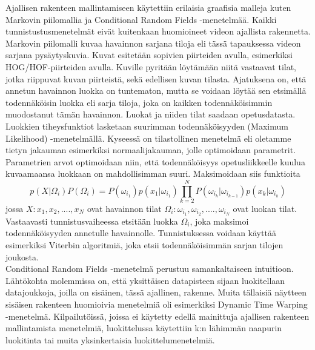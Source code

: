 Ajallisen rakenteen mallintamiseen käytettiin erilaisia graafisia malleja kuten Markovin piilomallia ja Conditional Random Fields -menetelmää.
Kaikki tunnistustusmenetelmät eivät kuitenkaan huomioineet videon ajallista rakennetta. \citep {6239178}\\ 

Markovin piilomalli kuvaa havainnon sarjana tiloja eli tässä tapauksessa videon sarjana pysäytyskuvia. 
Kuvat esitetään sopivien piirteiden avulla, esimerkiksi HOG/HOF-piirteiden avulla. Kuville
pyritään löytämään niitä vastaavat tilat, jotka riippuvat kuvan piirteistä, sekä edellisen kuvan tilasta.
Ajatuksena on, että annetun havainnon luokka on tuntematon, mutta se voidaan löytää sen etsimällä todennäköisin luokka
eli sarja tiloja, joka on kaikken todennäköisimmin muodostanut tämän havainnon. 
Luokat ja niiden tilat saadaan opetusdatasta. \citep{patternreg}\\

Luokkien tiheysfunktiot lasketaan suurimman todennäköisyyden (Maximum Likelihood) -menetelmällä. 
Kyseessä on tilastollinen menetelmä eli oletamme tietyn jakauman esimerkiksi normaalijakauman, jolle optimoidaan parametrit.
Parametrien arvot optimoidaan niin, että todennäköisyys opetusliikkeelle kuulua kuvaamaansa luokkaan on mahdollisimman suuri.
Maksimoidaan siis funktioita
\begin{equation}
p(X|\Omega_i)P(\Omega_i) = P(\omega_{i_1})p(x_1|\omega_{i_1})\prod_{k=2}^{N} P(\omega_{i_k}|\omega_{i_{k-1}}) p(x_k|\omega_{i_k})
\end{equation}
jossa $X:x_1, x_2,....,x_N$ ovat havainnon tilat $\Omega_i:\omega_{i_1}, \omega_{i_2},....,\omega_{i_N}$ ovat luokan tilat.
Vastaavasti tunnistusvaiheessa etsitään luokka $\Omega_i$, joka maksimoi todennäköisyyden annetulle havainnolle. 
Tunnistuksessa voidaan käyttää esimerkiksi Viterbin algoritmiä, joka etsii todennäköisimmän sarjan tilojen joukosta. \citep{patternreg}\\

Conditional Random Fields -menetelmä perustuu samankaltaiseen intuitioon. Lähtökohta molemmissa on, että yksittäisen 
datapisteen sijaan luokitellaan datajoukkoja, joilla on sisäinen, tässä ajallinen, rakenne. \citep {1315232}
Muita tällaisiä näytteen sisäisen rakenteen huomioivia menetelmiä oli esimerkiksi Dynamic Time Warping -menetelmä.
Kilpailutöissä, joissa ei käytetty edellä mainittuja ajallisen rakenteen mallintamista menetelmiä, 
luokittelussa käytettiin k:n lähimmän naapurin luokitinta tai muita yksinkertaisia luokittelumenetelmiä. \citep {6239178} \\

